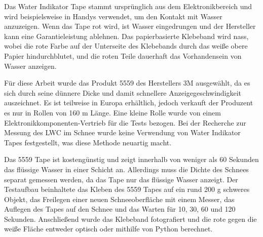 Das Water Indikator Tape stammt ursprünglich aus dem Elektronikbereich und wird beispielsweise in Handys verwendet, um den Kontakt mit Wasser anzuzeigen. Wenn das Tape rot wird, ist Wasser eingedrungen und der Hersteller kann eine Garantieleistung ablehnen. Das papierbasierte Klebeband wird nass, wobei die rote Farbe auf der Unterseite des Klebebands durch das weiße obere Papier hindurchblutet, und die roten Teile dauerhaft das Vorhandensein von Wasser anzeigen.

Für diese Arbeit wurde das Produkt 5559 des Herstellers 3M ausgewählt, da es sich durch seine dünnere Dicke und damit schnellere Anzeigegeschwindigkeit auszeichnet. Es ist teilweise in Europa erhältlich, jedoch verkauft der Produzent es nur in Rollen von 160 m Länge. Eine kleine Rolle wurde von einem Elektronikkomponenten-Vertrieb für die Tests bezogen. Bei der Recherche zur Messung des LWC im Schnee wurde keine Verwendung von Water Indikator Tapes festgestellt, was diese Methode neuartig macht.

Das 5559 Tape ist kostengünstig und zeigt innerhalb von weniger als 60 Sekunden das flüssige Wasser in einer Schicht an. Allerdings muss die Dichte des Schnees separat gemessen werden, da das Tape nur das flüssige Wasser anzeigt. Der Testaufbau beinhaltete das Kleben des 5559 Tapes auf ein rund 200 g schweres Objekt, das Freilegen einer neuen Schneeoberfläche mit einem Messer, das Auflegen des Tapes auf den Schnee und das Warten für 10, 30, 60 und 120 Sekunden. Anschließend wurde das Klebeband fotografiert und die rote gegen die weiße Fläche entweder optisch oder mithilfe von Python berechnet.

\iffalse
herkunft: Aus dem Elektronik bereich. zum beispiel in handys. wenn das tape rot geworden ist, ist wasser eingedrungen und der Hersteller kann eine garatieleistung ablehnen.

Funktionsweise: das papier basierte klebeband wird nass. die rote Farbe auf der Unterseite des Klebebands blutet durch das weisse obere Papier. die Roten Teile zeiget dann permanet wasser an.

Auswahl von 5559: der Hersteller 3M hat mehrere Produkte zu Water Indikator. 5559 zeichnet sich durch die dünnere Dicke und somit durch die schneller Anzeigegeschwindigkeit aus.

5559i ist auf einem transparenten substrat, was fraktisch für die optische auswertung wäre. Die Produkte sind in europa nur teilweise erhältlich. 3M verkauft nur Rollen mit 160 m. Zum testen wurde eine kleine rolle von einem Elektronikkomponenten Vertreiber gekauft.

Bei der Recherche zu LWC wurde keine verwendung von Water indicator tapes bemerkt. somit neuartig.

kostengünstig

zeitspanne pro messung weniger als 60 sek.

Dichte des Schnees muss seperat gemessen werden. 5559 zeigt nur das flüssige wasser in einer schicht an.

Testaufbau: 5559 auf etwas rund 200 g schweres kleben. neue Oberfläche von schnee mit Messer abschneiden/freilegen. 5559 auf schnee legen und 10, 30 60, 120 sek warten. foto von klebeband machen. mit python rote vs. weise fläche berechnen. oder nur optisch beurteilen.
\fi
